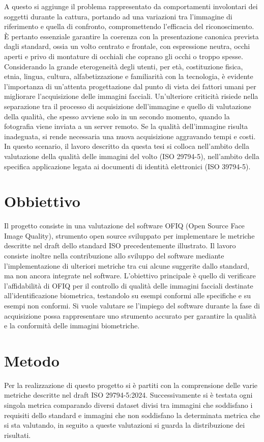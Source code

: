 \documentclass[12pt,a4paper,openright,twoside]{book}
\begin{document}
A questo si aggiunge il problema rappresentato da comportamenti involontari dei soggetti durante la cattura, portando ad una  variazioni tra l'immagine di riferimento e quella di confronto, compromettendo l'efficacia del riconoscimento.
È pertanto essenziale garantire la coerenza con la presentazione canonica prevista dagli standard, ossia un volto centrato e frontale, con espressione neutra, occhi aperti e privo di montature di occhiali che coprano gli occhi o troppo spesse.
Considerando la grande eterogeneità degli utenti, per età, costituzione fisica, etnia, lingua, cultura, alfabetizzazione e familiarità con la tecnologia, è evidente l'importanza di un'attenta progettazione dal punto di vista dei fattori umani per migliorare l'acquisizione delle immagini facciali.
Un'ulteriore criticità risiede nella separazione tra il processo di acquisizione dell'immagine e quello di valutazione della qualità, che spesso avviene solo in un secondo momento, quando la fotografia viene inviata a un server remoto.
Se la qualità dell'immagine risulta inadeguata, si rende necessaria una nuova acquisizione aggravando tempi e costi.
In questo scenario, il lavoro descritto da questa tesi si colloca nell'ambito della valutazione della qualità delle immagini del volto (ISO 29794-5), nell'ambito della specifica applicazione legata ai documenti di identità elettronici (ISO 39794-5).
\section{Obbiettivo}
Il progetto consiste in una valutazione del software OFIQ (Open Source Face Image Quality), strumento open source sviluppato per implementare le metriche descritte nel draft dello standard ISO precedentemente illustrato. Il lavoro consiste inoltre nella contribuzione allo sviluppo del software mediante l'implementazione di ulteriori metriche tra cui alcune suggerite dallo standard, ma non ancora integrate nel software. L'obiettivo principale è quello di verificare l'affidabilità di OFIQ per il controllo di qualità delle immagini facciali destinate all'identificazione biometrica, testandolo su esempi conformi alle specifiche e su esempi non conformi. Si vuole valutare se l'impiego del software durante la fase di acquisizione possa rappresentare uno strumento accurato per garantire la qualità e la conformità delle immagini biometriche.  

\section{Metodo}
Per la realizzazione di questo progetto si è partiti con la comprensione delle varie metriche descritte nel draft ISO 29794-5:2024.
Successivamente si è testata ogni singola metrica comparando diversi dataset divisi tra immagini che soddisfano i requisiti dello standard e immagini che non soddisfano la determinata metrica che si sta valutando, in seguito a queste valutazioni si guarda la distribuzione dei risultati. 
\end{document}
